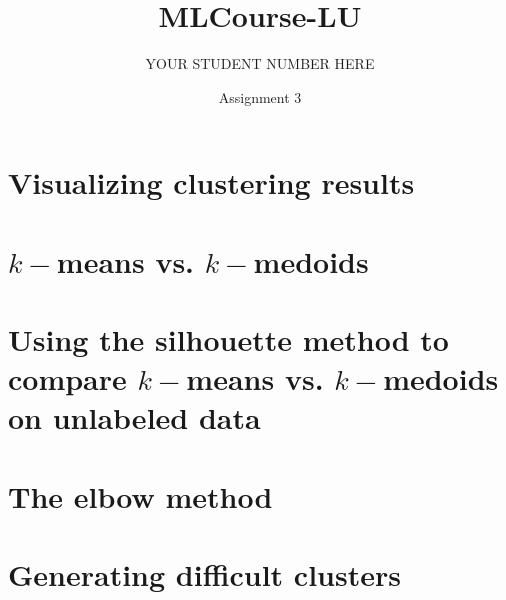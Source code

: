 \documentclass{article}
\title{MLCourse-LU}
\author{YOUR STUDENT NUMBER HERE}
\date{Assignment 3}
\begin{document}



\maketitle

\section{Visualizing clustering results}


\section{$k-$means vs. $k-$medoids}


\section{Using the silhouette method to compare $k-$means vs. $k-$medoids on unlabeled data}


\section{The elbow method}

\section{Generating difficult clusters}
\end{document}
